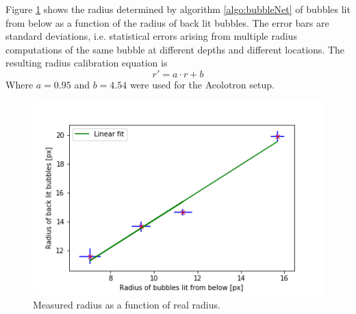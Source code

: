 			Figure \ref{fig:radius_calib_result} shows the radius determined by algorithm \ref{algo:bubbleNet} of bubbles lit from below as a function of the radius of back lit bubbles. The error bars are standard deviations, i.e. statistical errors arising from multiple radius computations of the same bubble at different depths and different locations. The resulting radius calibration equation is 
			\begin{equation}
				r' = a \cdot r + b
				\label{eq:radius_calib}
			\end{equation}
			Where $a= 0.95$ and $b=4.54$ were used for the Aeolotron setup. 
			
			\begin{figure}
				\centering
				\includegraphics[scale=0.5]{graphs/radius_calibration_result.png}
				\caption{Measured radius as a function of real radius.}
				\label{fig:radius_calib_result}
			\end{figure}
			
			
			
			
			
































